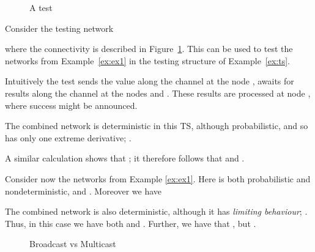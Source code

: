 \documentclass{LMCS}
\begin{document}
\begin{figure}

\caption{ A test} 
\label{fig:testex}
\end{figure}

\begin{exa}\label{ex:testing} 
  Consider the testing network 

where the connectivity is described in Figure~\ref{fig:testex}. This can be used to test the networks 
 from Example~\ref{ex:ex1} in the testing structure of Example~\ref{ex:ts}. 
 
Intuitively the test sends the value  along the channel  at the node , awaits for results along the channel
 at the nodes  and . These results are processed at node , where success might be announced. 

The combined network
 is deterministic in this TS, although probabilistic, and so has only one extreme
derivative; .


A similar calculation shows that  ;  it 
therefore follows that  and . 

Consider now the networks  from Example \ref{ex:ex1}. 
Here  is both probabilistic and nondeterministic, and
 . Moreover 
 we have 


The combined network  is also deterministic, although it has 
\emph{limiting behaviour}; . Thus, in this case we 
have both  and 
. 
Further, we have that 
, but 
.
 \end{exa}

\begin{figure}


                                   



 \caption{Broadcast vs Multicast}
\label{fig:bcast}
\end{figure}
\end{document}
